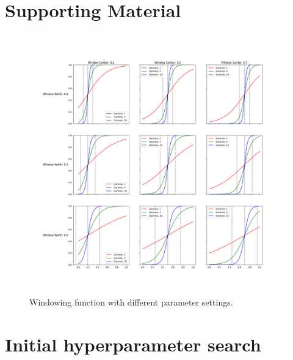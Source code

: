 \documentclass[nomenclature, english, bibtex]{kththesis}
\newcommand*{\warningExpl}[1]{\todo[inline, backgroundcolor=kth-lightred40]{#1}} %
\numberwithin{listing}{chapter}
\begin{document}
\appendix
\renewcommand{\chaptermark}[1]{\markboth{Appendix \thechapter\relax:\thinspace\relax#1}{}}
\chapter{Supporting Material}

\begin{figure}
    \centering
    \includegraphics[width=1.0\textwidth]{figures/window_params.png}
    \caption{Windowing function with different parameter settings.}
    \label{fig:windowingParams}
\end{figure}



\chapter{Initial hyperparameter search}
\label{sec:initialHyperparameterSearch}
\end{document}
